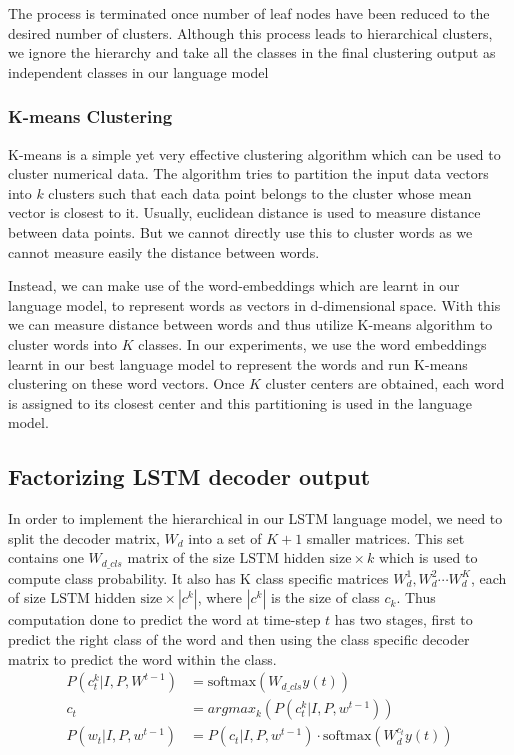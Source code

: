 The process is terminated once number of leaf nodes have been reduced to the
desired number of clusters. 
Although this process leads to hierarchical clusters, we ignore the hierarchy
and take all the classes in the final clustering output as independent classes
in our language model 
\subsubsection*{K-means Clustering}

K-means is a simple yet very effective clustering algorithm which can be used to
cluster numerical data.
The algorithm tries to partition the input data vectors into $k$ clusters such
that each data point belongs to the cluster whose mean vector is closest to it.
Usually, euclidean distance is used to measure distance between data points.
But we cannot directly use this to cluster words as we cannot measure easily the
distance between words.

Instead, we can make use of the word-embeddings which are learnt in our language
model, to represent words as vectors in d-dimensional space.
With this we can measure distance between words and thus utilize K-means
algorithm to cluster words into $K$ classes.
In our experiments, we use the word embeddings learnt in our best language model to
represent the words and run K-means clustering on these word vectors.
Once $K$ cluster centers are obtained, each word is assigned to its closest center
and this partitioning is used in the language model.

\subsection{Factorizing LSTM decoder output}
In order to implement the hierarchical in our LSTM language model, we need to
split the decoder matrix, $W_d$ into a set of $K+1$ smaller matrices.
This set contains one $W_{d\_cls}$  matrix of the size $\text{LSTM hidden size}
\times k$
which is used to compute class probability.
It also has K class specific matrices ${W_{d}^{1},W_{d}^{2}\cdots W_{d}^{K}}$,
each of size $\text{LSTM hidden size}\times |c^k|$, where $|c^k|$ is the size of class
$c_k$.
Thus computation done to predict the word at time-step $t$ has two stages, first
to predict the right class of the word and then using the class specific decoder
matrix to predict the word within the class.
\begin{align}
        \label{eq:classLStmdecoder}
        P(c_{t}^{k}| I,P, W^{t-1}) &= \text{softmax}(W_{d\_cls} y(t)) \\
        c_t &= argmax_k\left(P(c_{t}^k| I,P, w^{t-1})\right) \\
        P(w_t | I,P, w^{t-1}) &= P(c_t| I,P, w^{t-1}) \cdot \text{softmax}(W_{d}^{c_t} y(t))
\end{align}

